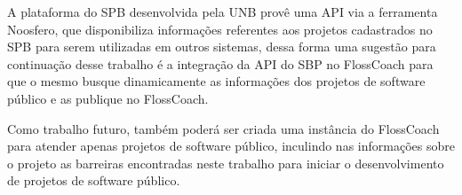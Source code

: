 A plataforma do SPB desenvolvida pela UNB provê uma API via a ferramenta Noosfero,
que disponibiliza informações referentes aos projetos cadastrados no SPB para
serem utilizadas em outros sistemas, dessa forma uma sugestão para continuação
desse trabalho é a integração da API do SBP no FlossCoach para que o mesmo 
busque dinamicamente as informações dos projetos de software público e as
publique no FlossCoach.

Como trabalho futuro, também poderá ser criada uma instância do FlossCoach para
atender apenas projetos de software público, inculindo nas informações sobre
o projeto as barreiras encontradas neste trabalho para iniciar o desenvolvimento de 
projetos de software público.


